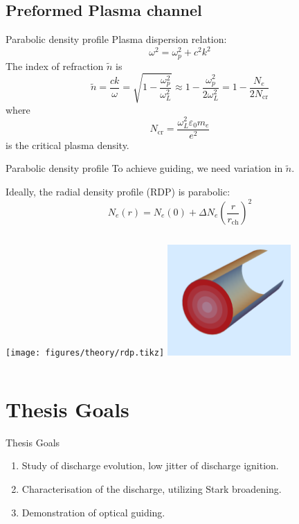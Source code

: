 \documentclass[dvipsnames]{beamer}
\begin{document}
\subsection{Preformed Plasma channel}
\begin{frame}{Parabolic density profile}
 Plasma dispersion relation:
 \begin{equation*}
\omega^2=\omega_p^2+c^2k^2
 \end{equation*}
 The index of refraction $\tilde n$ is
 \begin{equation*}
\tilde{n}=\frac{c k}{\omega}=\sqrt{1-\frac{\omega_p^2}{\omega_L^2}}\approx1-\frac{\omega_p^2}{2\omega_L^2}=1-\frac{N_e}{2N_\text{cr}}
 \end{equation*}
 {\small where
\begin{equation*}
    N_\text{cr}=\frac{\omega_L^2\varepsilon_0 m_e}{e^2}
\end{equation*}
is the critical plasma density.}
\end{frame}
\begin{frame}{Parabolic density profile}
 To achieve guiding, we need variation in $\tilde{n}$.

 Ideally, the radial density profile (RDP) is parabolic:
\begin{equation*}
N_e(r)=N_e(0)+\Delta N_e\left( \frac{r}{r_\text{ch}}\right)^2
 \end{equation*}
 \begin{columns}
\texttt{[image: figures/theory/rdp.tikz]}
\includegraphics[height=120pt]{figures/theory/why channel forms.png}
 \end{columns}
\end{frame}

\section{Thesis Goals}
\begin{frame}{Thesis Goals}
 \begin{enumerate}
\item Study of discharge evolution, low jitter of discharge ignition.
\item Characterisation of the discharge, utilizing Stark broadening.
\item Demonstration of optical guiding.
 \end{enumerate}
\end{frame}
\end{document}
